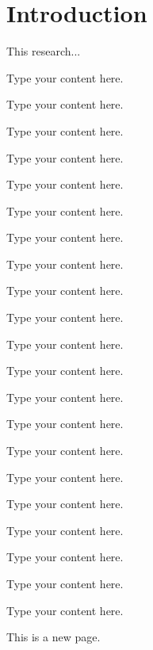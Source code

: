 %

\chapter{Introduction}


This research...

Type your content here.

Type your content here.

Type your content here.

Type your content here.

Type your content here.

Type your content here.

Type your content here.

Type your content here.

Type your content here.

Type your content here.

Type your content here.

Type your content here.

Type your content here.

Type your content here.

Type your content here.

Type your content here.

Type your content here.

Type your content here.

Type your content here.

Type your content here.

Type your content here.

This is a new page.

\chapterend

